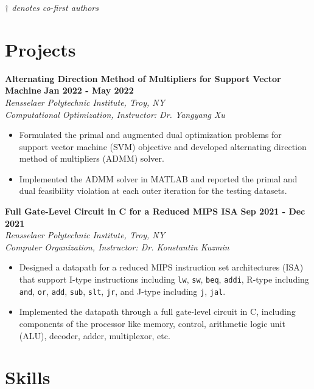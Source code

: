 \documentclass[letterpaper, 11pt]{article}
\newcommand{\subsectionvspace}{\vspace{6pt}}
\begin{document}
    \subsectionvspace

    \textit{$\dag$ denotes co-first authors}


\section{Projects}


    \textbf{Alternating Direction Method of Multipliers for Support Vector Machine} \hfill 
    \textbf{Jan 2022 - May 2022} \\
    \textit{Rensselaer Polytechnic Institute, Troy, NY} \\
    \textit{Computational Optimization, Instructor: Dr. Yangyang Xu}
    \begin{itemize}
        \item Formulated the primal and augmented dual optimization problems for support vector machine (SVM) objective and developed alternating direction method of multipliers (ADMM) solver.
        \item Implemented the ADMM solver in MATLAB and reported the primal and dual feasibility violation at each outer iteration for the testing datasets.
    \end{itemize}

    \subsectionvspace

    \textbf{Full Gate-Level Circuit in C for a Reduced MIPS ISA} \hfill 
    \textbf{Sep 2021 - Dec 2021} \\
    \textit{Rensselaer Polytechnic Institute, Troy, NY} \\
    \textit{Computer Organization, Instructor: Dr. Konstantin Kuzmin}
    \begin{itemize}
        \item Designed a datapath for a reduced MIPS instruction set architectures (ISA) that support I-type instructions including \verb|lw|, \verb|sw|, \verb|beq|, \verb|addi|, R-type including \verb|and|, \verb|or|, \verb|add|, \verb|sub|, \verb|slt|, \verb|jr|, and J-type including \verb|j|, \verb|jal|.
        \item Implemented the datapath through a full gate-level circuit in C, including components of the processor like memory, control, arithmetic logic unit (ALU), decoder, adder, multiplexor, etc.
    \end{itemize}


\section{Skills}
\end{document}

